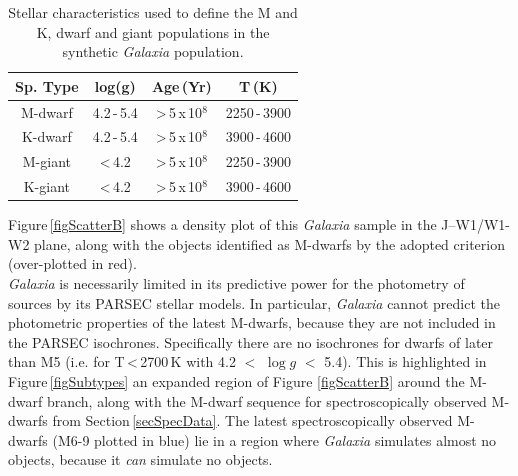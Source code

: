 \begin{table}
\begin{center}
	\begin{tabular}{| c | c | c | c |}
		\hline
        Sp. Type & log(g) & Age\,(Yr) & T\,(K) \\
        \hline
        M-dwarf & 4.2\,-\,5.4 & \textgreater\,5\,x\,10$^{8}$ & 2250\,-\,3900 \\
        K-dwarf & 4.2\,-\,5.4 & \textgreater\,5\,x\,10$^{8}$ & 3900\,-\,4600 \\
        M-giant & \textless\,4.2 & \textgreater\,5\,x\,10$^{8}$ & 2250\,-\,3900 \\
        K-giant & \textless\,4.2 & \textgreater\,5\,x\,10$^{8}$ & 3900\,-\,4600 \\
        \hline
\end{tabular}
\caption{Stellar characteristics used to define the M and K, dwarf and giant populations in the synthetic {\em Galaxia} population.}
\label{TabMK}
\end{center}
\end{table}
Figure\,\ref{figScatterB} shows a density plot of this {\em Galaxia} sample in the J--W1/W1-W2 plane, along with the objects identified as M-dwarfs by the adopted criterion (over-plotted in red).\\

{\em Galaxia} is necessarily limited in its predictive power for the photometry of sources by its PARSEC stellar models. In particular, {\em Galaxia} cannot predict the photometric properties of the latest M-dwarfs, because they are not included in the PARSEC isochrones. Specifically there are no isochrones for dwarfs of later than M5 (i.e. for T\,\textless\,2700\,K with 4.2 $<$ $\log g$ $<$ 5.4). This is highlighted in Figure\,\ref{figSubtypes} an expanded region of Figure \ref{figScatterB} around the M-dwarf branch, along with the M-dwarf sequence for spectroscopically observed M-dwarfs from Section\,\ref{secSpecData}. The latest spectroscopically observed M-dwarfs (M6-9 plotted in blue) lie in a region where {\em Galaxia} simulates almost no objects, because it {\em can} simulate no objects.\\

